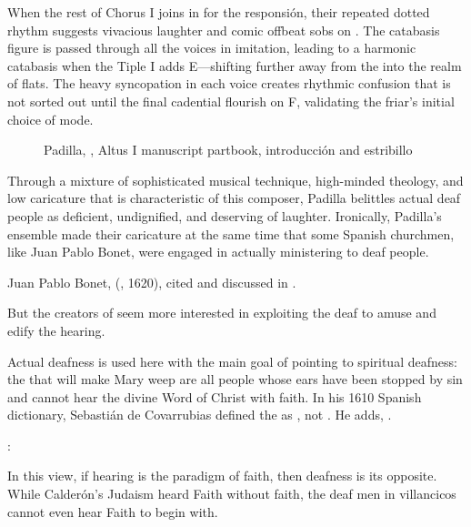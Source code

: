 When the rest of Chorus I joins in for the responsión, their repeated dotted rhythm suggests vivacious laughter and comic offbeat sobs on .
The catabasis figure is passed through all the voices in imitation, leading to a harmonic catabasis when the Tiple I adds E\fl{}---shifting further away from the  into the  realm of flats.%
\citXXX[chafe?]
The heavy syncopation in each voice creates rhythmic confusion that is not sorted out until the final cadential flourish on F, validating the friar's initial choice of mode.

\begin{figure}
    \caption{Padilla, , Altus I manuscript partbook, introducción and estribillo}
    \label{figure:Padilla-Sordo-MS-estribillo}
\end{figure}

Through a mixture of sophisticated musical technique, high-minded theology, and low caricature that is characteristic of this composer, Padilla belittles actual deaf people as deficient, undignified, and deserving of laughter.
Ironically, Padilla's ensemble made their caricature at the same time that some Spanish churchmen, like Juan Pablo Bonet, were engaged in actually ministering to deaf people.%
\begin{Footnote}
    Juan Pablo Bonet,  (\XXX, 1620), cited and discussed in \autocite{Plann:DeafEducationSpain}.
\end{Footnote}
But the creators of  seem more interested in exploiting the deaf to amuse and edify the hearing.

Actual deafness is used here with the main goal of pointing to spiritual deafness: the  that will make Mary weep are all people whose ears have been stopped by sin and cannot hear the divine Word of Christ with faith.
In his 1610 Spanish dictionary, Sebastián de Covarrubias defined the  as , not .
He adds, .%
\begin{Footnote}
    \Autocite[]{Covarrubias:Tesoro}:
\end{Footnote}
In this view, if hearing is the paradigm of faith, then deafness is its opposite.
While Calderón's Judaism heard Faith without faith, the deaf men in villancicos cannot even hear Faith to begin with.

